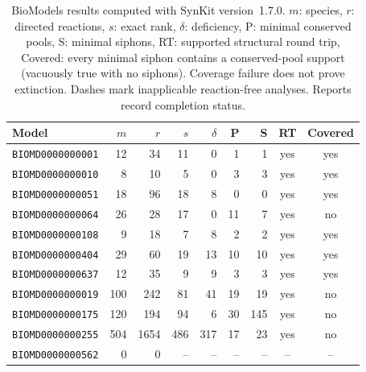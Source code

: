 \documentclass[10pt,a4paper,fleqn]{article}
\theoremstyle{plain}\newtheorem{theorem}{Theorem}
\begin{document}
\begin{table}[htbp]
\centering
\caption{BioModels results computed with SynKit version~1.7.0. $m$: species, $r$: directed reactions, $s$: exact rank, $\delta$: deficiency, P: minimal conserved pools, S: minimal siphons, RT: supported structural round trip, Covered: every minimal siphon contains a conserved-pool support (vacuously true with no siphons). Coverage failure does not prove extinction. Dashes mark inapplicable reaction-free analyses. Reports record completion status.}
\label{tab:biomodels_models}
\scriptsize
\setlength{\tabcolsep}{3pt}
\begin{tabular*}{\linewidth}{@{\extracolsep{\fill}}lrrrrrrcc@{}}
\toprule
Model & $m$ & $r$ & $s$ & $\delta$ & P & S & RT & Covered \\
\midrule
\texttt{BIOMD0000000001} & 12 & 34 & 11 & 0 & 1 & 1 & yes & yes \\
\texttt{BIOMD0000000010} & 8 & 10 & 5 & 0 & 3 & 3 & yes & yes \\
\texttt{BIOMD0000000051} & 18 & 96 & 18 & 8 & 0 & 0 & yes & yes \\
\texttt{BIOMD0000000064} & 26 & 28 & 17 & 0 & 11 & 7 & yes & no \\
\texttt{BIOMD0000000108} & 9 & 18 & 7 & 8 & 2 & 2 & yes & yes \\
\texttt{BIOMD0000000404} & 29 & 60 & 19 & 13 & 10 & 10 & yes & yes \\
\texttt{BIOMD0000000637} & 12 & 35 & 9 & 9 & 3 & 3 & yes & yes \\
\texttt{BIOMD0000000019} & 100 & 242 & 81 & 41 & 19 & 19 & yes & no \\
\texttt{BIOMD0000000175} & 120 & 194 & 94 & 6 & 30 & 145 & yes & no \\
\texttt{BIOMD0000000255} & 504 & 1654 & 486 & 317 & 17 & 23 & yes & no \\
\texttt{BIOMD0000000562} & 0 & 0 & -- & -- & -- & -- & -- & -- \\
\bottomrule
\end{tabular*}
\end{table}
\end{document}
